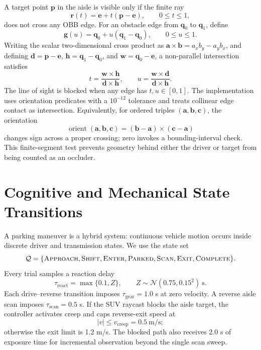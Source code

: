 \documentclass[11pt]{article}
\newcommand{\vect}[1]{\boldsymbol{#1}}
\begin{document}
A target point $\vect{p}$ in the aisle is visible only if the finite ray
\begin{equation}
  \vect{r}(t)=\vect{e}+t(\vect{p}-\vect{e}), \qquad 0\le t\le1,
\end{equation}
does not cross any OBB edge. For an obstacle edge from $\vect{q}_0$ to $\vect{q}_1$, define
\begin{equation}
  \vect{g}(u)=\vect{q}_0+u(\vect{q}_1-\vect{q}_0), \qquad 0\le u\le1.
\end{equation}
Writing the scalar two-dimensional cross product as $\vect{a}\times\vect{b}=a_xb_y-a_yb_x$, and defining $\vect{d}=\vect{p}-\vect{e}$, $\vect{h}=\vect{q}_1-\vect{q}_0$, and $\vect{w}=\vect{q}_0-\vect{e}$, a non-parallel intersection satisfies
\begin{equation}
  t=\frac{\vect{w}\times\vect{h}}{\vect{d}\times\vect{h}},
  \qquad
  u=\frac{\vect{w}\times\vect{d}}{\vect{d}\times\vect{h}}.
\end{equation}
The line of sight is blocked when any edge has $t,u\in[0,1]$. The implementation uses orientation predicates with a $10^{-12}$ tolerance and treats collinear edge contact as intersection. Equivalently, for ordered triples $(\vect{a},\vect{b},\vect{c})$, the orientation
\begin{equation}
  \operatorname{orient}(\vect{a},\vect{b},\vect{c})
  =(\vect{b}-\vect{a})\times(\vect{c}-\vect{a})
\end{equation}
changes sign across a proper crossing; zero invokes a bounding-interval check. This finite-segment test prevents geometry behind either the driver or target from being counted as an occluder.

\section{Cognitive and Mechanical State Transitions}

A parking maneuver is a hybrid system: continuous vehicle motion occurs inside discrete driver and transmission states. We use the state set
\begin{equation}
\mathcal{Q}=\{\textsc{Approach},\textsc{Shift},\textsc{Enter},\textsc{Parked},
\textsc{Scan},\textsc{Exit},\textsc{Complete}\}.
\end{equation}
Every trial samples a reaction delay
\begin{equation}
  \tau_{\mathrm{react}}=\max\{0.1, Z\},\qquad
  Z\sim\mathcal{N}(0.75,0.15^2)\ \mathrm{s}.
\end{equation}
Each drive--reverse transition imposes $\tau_{\mathrm{gear}}=1.0$ s at zero velocity. A reverse aisle scan imposes $\tau_{\mathrm{scan}}=0.5$ s. If the SUV raycast blocks the aisle target, the controller activates creep and caps reverse-exit speed at
\begin{equation}
  |v|\le v_{\mathrm{creep}}=0.5\ \mathrm{m/s};
\end{equation}
otherwise the exit limit is 1.2 m/s. The blocked path also receives 2.0 s of exposure time for incremental observation beyond the single scan sweep.
\end{document}
